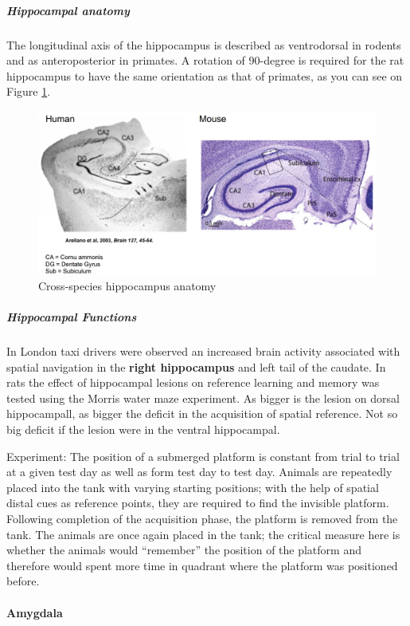 \documentclass[12pt,article,oneside,a4paper]{memoir}
\begin{document}
\subparagraph{Hippocampal anatomy} The longitudinal axis of the hippocampus is described as ventrodorsal in rodents and as anteroposterior in primates. A rotation of 90-degree is required for the rat hippocampus to have the same orientation as that of primates, as you can see on Figure \ref{fig:hippocampusAnatomy}.
\begin{figure}[H]
	\centering
  	\includegraphics[width=\linewidth]{imgs/cross-species-hippocampus-anatomy.png}
	\caption{Cross-species hippocampus anatomy}
  	\label{fig:hippocampusAnatomy}
\end{figure}

\subparagraph{Hippocampal Functions} In London taxi drivers were observed an increased brain activity associated with spatial navigation in the \textbf{right hippocampus} and left tail of the caudate. In rats the effect of hippocampal lesions on reference learning and memory was tested using the Morris water maze experiment. As bigger is the lesion on dorsal hippocampall, as bigger the deficit in the acquisition of spatial reference. Not so big deficit if the lesion were in the ventral hippocampal.

Experiment: The position of a submerged platform is constant from trial to trial at a given test day as well as form test day to test day. Animals are repeatedly placed into the tank with varying starting positions; with the help of spatial distal cues as reference points, they are required to find the invisible platform. Following completion of the acquisition phase, the platform is removed from the tank. The animals are once again placed in the tank; the critical measure here is whether the animals would “remember” the position of the platform and therefore would spent more time in quadrant where the platform was positioned before.

\paragraph{Amygdala}
\end{document}
